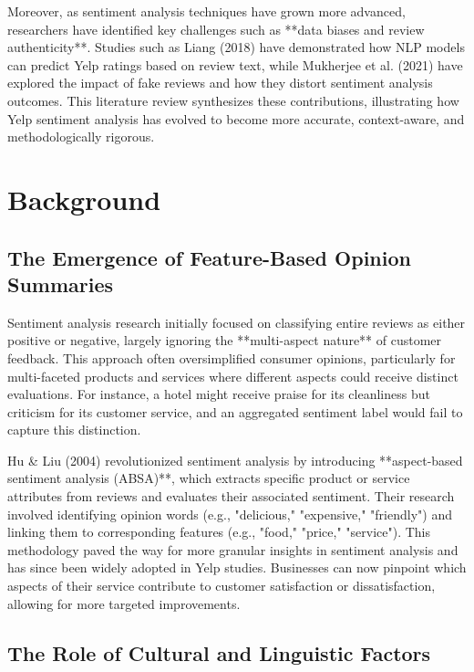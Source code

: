 \documentclass{article}
\begin{document}
Moreover, as sentiment analysis techniques have grown more advanced, researchers have identified key challenges such as **data biases and review authenticity**. Studies such as Liang (2018)\cite{Liang2018} have demonstrated how NLP models can predict Yelp ratings based on review text, while Mukherjee et al. (2021)\cite{Mukherjee2021} have explored the impact of fake reviews and how they distort sentiment analysis outcomes. This literature review synthesizes these contributions, illustrating how Yelp sentiment analysis has evolved to become more accurate, context-aware, and methodologically rigorous.

\section{Background}

\subsection{The Emergence of Feature-Based Opinion Summaries}

Sentiment analysis research initially focused on classifying entire reviews as either positive or negative, largely ignoring the **multi-aspect nature** of customer feedback. This approach often oversimplified consumer opinions, particularly for multi-faceted products and services where different aspects could receive distinct evaluations. For instance, a hotel might receive praise for its cleanliness but criticism for its customer service, and an aggregated sentiment label would fail to capture this distinction.

Hu \& Liu (2004)\cite{HuLiu2004} revolutionized sentiment analysis by introducing **aspect-based sentiment analysis (ABSA)**, which extracts specific product or service attributes from reviews and evaluates their associated sentiment. Their research involved identifying opinion words (e.g., "delicious," "expensive," "friendly") and linking them to corresponding features (e.g., "food," "price," "service"). This methodology paved the way for more granular insights in sentiment analysis and has since been widely adopted in Yelp studies. Businesses can now pinpoint which aspects of their service contribute to customer satisfaction or dissatisfaction, allowing for more targeted improvements.

\subsection{The Role of Cultural and Linguistic Factors}
\end{document}
